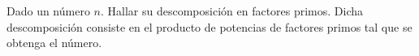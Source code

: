 Dado un número \( n \). Hallar su descomposición en factores primos. Dicha descomposición consiste en el producto de potencias de factores primos tal que se obtenga el número.
